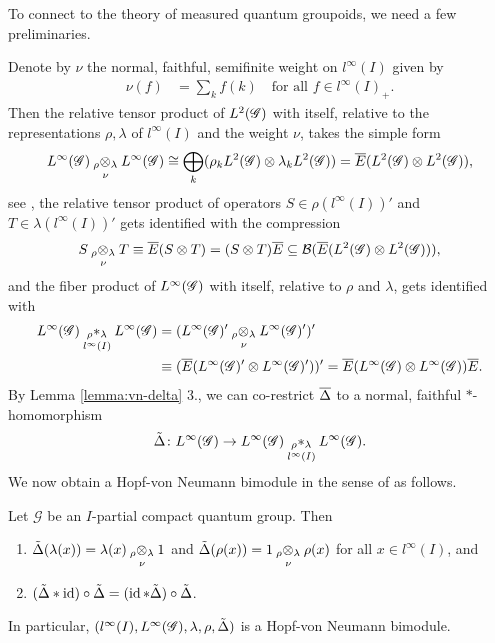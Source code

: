 To connect to the theory of measured quantum groupoids, we need a few
preliminaries.

Denote by $\nu$ the
normal, faithful, semifinite weight on $l^{\infty}(I)$ given by
\begin{align} \label{eq:vn-nu}
  \nu(f) &=\sum_{k} f(k) \quad \text{for all } f\in l^{\infty}(I)_{+}.
\end{align}
Then the relative tensor product of $L^{2}(\mathscr{G})$ with itself,
relative to the representations $\rho,\lambda$ of $l^{\infty}(I)$ and
the weight $\nu$, takes the simple form
\begin{align*}
L^{\infty}(\mathscr{G}) \underset{\nu{}}{_{\rho}\otimes_{\lambda}} L^{\infty}(\mathscr{G}) \cong
  \bigoplus_{k} (\rho_{k}L^{2}(\mathscr{G}) \otimes \lambda_{k}L^{2}(\mathscr{G})) =
  \overline{E}(L^{2}(\mathscr{G}) \otimes L^{2}(\mathscr{G})),
\end{align*}
see \cite{},  the relative tensor product
of operators $S\in \rho(l^{\infty}(I))'$ and $T \in
\lambda(l^{\infty}(I))'$ gets identified with the compression
\begin{align*}
S \underset{\nu{}}{_{\rho}\otimes_{\lambda}} T \equiv
  \overline{E}(S \otimes
  T) = (S \otimes T)\overline{E} \subseteq {\cal B}(\overline{E}(L^{2}(\mathscr{G})
  \otimes L^{2}(\mathscr{G}))),
\end{align*}
and the fiber product of  $  L^{\infty}(\mathscr{G})$ with itself, relative to $\rho$
and $\lambda$,  gets identified with
\begin{align} \label{eq:vn-fiber}
  \begin{aligned}
    L^{\infty}(\mathscr{G}) \underset{l^{\infty}(I)}{_{\rho}\ast_{\lambda}} L^{\infty}(\mathscr{G}) &= (L^{\infty}(\mathscr{G})' \underset{\nu{}}{_{\rho}\otimes_{\lambda}} L^{\infty}(\mathscr{G})')' \\ &\equiv
    (\overline{E}(L^{\infty}(\mathscr{G})' \otimes L^{\infty}(\mathscr{G})'))' = \overline{E}(L^{\infty}(\mathscr{G}) \otimes
    L^{\infty}(\mathscr{G}))\overline{E}.
  \end{aligned}
\end{align} 
By Lemma \ref{lemma:vn-delta} 3., we can co-restrict $\overline{\Delta}$ to  a
normal, faithful $*$-homomorphism
\begin{align*}
  \tilde\Delta \colon L^{\infty}(\mathscr{G}) \to   L^{\infty}(\mathscr{G}) \underset{l^{\infty}(I)}{_{\rho}\ast_{\lambda}} L^{\infty}(\mathscr{G}).
\end{align*}
We now obtain a Hopf-von Neumann bimodule in the
sense of \cite{} as follows.
\begin{Prop}
  Let $\mathscr{G}$ be an $I$-partial compact quantum group. Then
  \begin{enumerate}
  \item $\tilde\Delta(\lambda(x)) = \lambda(x) \underset{\nu{}}{_{\rho}\otimes_{\lambda}} 1$ and
    $\tilde\Delta(\rho(x)) = 1 \underset{\nu{}}{_{\rho}\otimes_{\lambda}} \rho(x)$ for all $x\in
    l^{\infty}(I)$, and
  \item $(\tilde\Delta \ast \operatorname{id})\circ \tilde\Delta = (\operatorname{id} \ast \tilde\Delta)
    \circ \tilde\Delta$.
  \end{enumerate}
  In particular, $(l^{\infty}(I),L^{\infty}(\mathscr{G}), \lambda,\rho,\tilde\Delta)$ is a
  Hopf-von Neumann bimodule.
\end{Prop}

